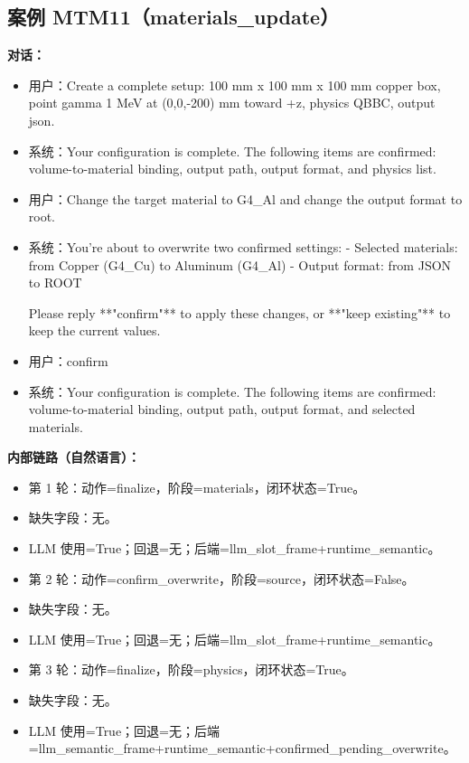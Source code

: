 \documentclass[11pt]{ctexart}
\begin{document}
\subsection{案例 MTM11（materials\_update）}
\textbf{对话：}
\begin{itemize}
\item 用户：Create a complete setup: 100 mm x 100 mm x 100 mm copper box, point gamma 1 MeV at (0,0,-200) mm toward +z, physics QBBC, output json.
\item 系统：Your configuration is complete. The following items are confirmed: volume-to-material binding, output path, output format, and physics list.
\item 用户：Change the target material to G4\_Al and change the output format to root.
\item 系统：You're about to overwrite two confirmed settings:
- Selected materials: from Copper (G4\_Cu) to Aluminum (G4\_Al)
- Output format: from JSON to ROOT

Please reply **"confirm"** to apply these changes, or **"keep existing"** to keep the current values.
\item 用户：confirm
\item 系统：Your configuration is complete. The following items are confirmed: volume-to-material binding, output path, output format, and selected materials.
\end{itemize}
\textbf{内部链路（自然语言）：}
\begin{itemize}
\item 第 1 轮：动作=finalize，阶段=materials，闭环状态=True。
\item 缺失字段：无。
\item LLM 使用=True；回退=无；后端=llm\_slot\_frame+runtime\_semantic。
\item 第 2 轮：动作=confirm\_overwrite，阶段=source，闭环状态=False。
\item 缺失字段：无。
\item LLM 使用=True；回退=无；后端=llm\_slot\_frame+runtime\_semantic。
\item 第 3 轮：动作=finalize，阶段=physics，闭环状态=True。
\item 缺失字段：无。
\item LLM 使用=True；回退=无；后端=llm\_semantic\_frame+runtime\_semantic+confirmed\_pending\_overwrite。
\end{itemize}
\end{document}
